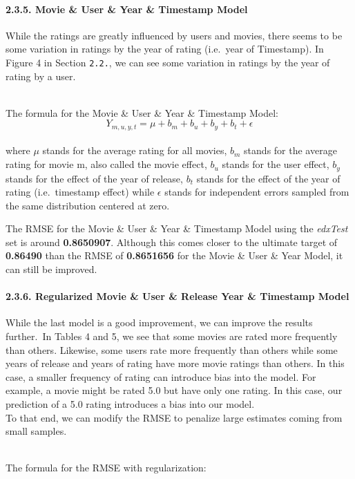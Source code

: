 \documentclass[
]{article}
\begin{document}
\hypertarget{movie-user-year-timestamp-model}{%
\paragraph{2.3.5. Movie \& User \& Year \& Timestamp
Model}\label{movie-user-year-timestamp-model}}

\hfill\break
While the ratings are greatly influenced by users and movies, there
seems to be some variation in ratings by the year of rating (i.e.~year
of Timestamp). In Figure 4 in Section \texttt{2.2.}, we can see some
variation in ratings by the year of rating by a user.\\
\strut \\
The formula for the Movie \& User \& Year \& Timestamp Model:\\
\[Y_{m, u, y, t} = \mu+b_{m}+b_{u}+b_{y}+b_{t}+ \epsilon\]\\
where \(\mu\) stands for the average rating for all movies, \(b_m\)
stands for the average rating for movie m, also called the movie effect,
\(b_u\) stands for the user effect, \(b_y\) stands for the effect of the
year of release, \(b_t\) stands for the effect of the year of rating
(i.e.~timestamp effect) while \(\epsilon\) stands for independent errors
sampled from the same distribution centered at zero.

The RMSE for the Movie \& User \& Year \& Timestamp Model using the
\emph{edxTest} set is around \textbf{0.8650907}. Although this comes
closer to the ultimate target of \textbf{0.86490} than the RMSE of
\textbf{0.8651656} for the Movie \& User \& Year Model, it can still be
improved.

\hypertarget{regularized-movie-user-release-year-timestamp-model}{%
\paragraph{\texorpdfstring{2.3.6. Regularized Movie \& User \& Release
Year \& Timestamp Model\\
}{2.3.6. Regularized Movie \& User \& Release Year \& Timestamp Model }}\label{regularized-movie-user-release-year-timestamp-model}}

While the last model is a good improvement, we can improve the results
further.~In Tables 4 and 5, we see that some movies are rated more
frequently than others. Likewise, some users rate more frequently than
others while some years of release and years of rating have more movie
ratings than others. In this case, a smaller frequency of rating can
introduce bias into the model. For example, a movie might be rated 5.0
but have only one rating. In this case, our prediction of a 5.0 rating
introduces a bias into our model.\\
To that end, we can modify the RMSE to penalize large estimates coming
from small samples.\\
\strut \\
The formula for the RMSE with regularization:
\end{document}
